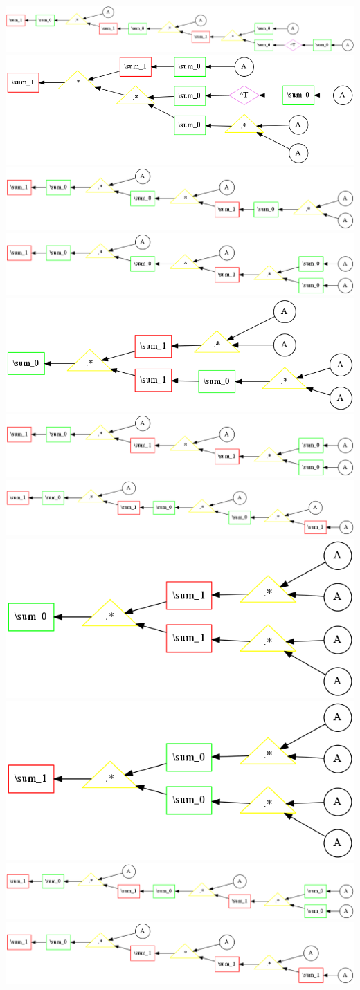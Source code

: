 \begin{center}
\includegraphics[width=0.45\linewidth]{trees/RBM_4_horizontal_10.png}
\includegraphics[width=0.45\linewidth]{trees/RBM_4_horizontal_11.png}
\includegraphics[width=0.45\linewidth]{trees/RBM_4_horizontal_12.png}
\includegraphics[width=0.45\linewidth]{trees/RBM_4_horizontal_13.png}
\includegraphics[width=0.45\linewidth]{trees/RBM_4_horizontal_14.png}
\includegraphics[width=0.45\linewidth]{trees/RBM_4_horizontal_15.png}
\includegraphics[width=0.45\linewidth]{trees/RBM_4_horizontal_16.png}
\includegraphics[width=0.45\linewidth]{trees/RBM_4_horizontal_17.png}
\includegraphics[width=0.45\linewidth]{trees/RBM_4_horizontal_18.png}
\includegraphics[width=0.45\linewidth]{trees/RBM_4_horizontal_19.png}
\includegraphics[width=0.45\linewidth]{trees/RBM_4_horizontal_20.png}
\end{center}


